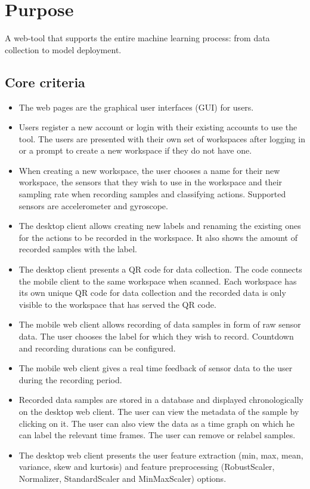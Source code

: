 \section{Purpose}
A web-tool that supports the entire machine learning process: from data collection to model deployment.

\subsection{Core criteria}
\begin{itemize}
    \item The web pages are the graphical user interfaces (GUI) for users.
    \item Users register a new account or login with their existing accounts to use the tool. The users are presented with their own set of workspaces after logging in or a prompt to create a new workspace if they do not have one.
    \item When creating a new workspace, the user chooses a name for their new workspace, the sensors that they wish to use in the workspace and their sampling rate when recording samples and classifying actions. Supported sensors are accelerometer and gyroscope.
    \item The desktop client allows creating new labels and renaming the existing ones for the actions to be recorded in the workspace. It also shows the amount of recorded samples with the label. 
    \item The desktop client presents a QR code for data collection. The code connects the mobile client to the same \gls{workspace} when scanned. Each workspace has its own unique QR code for data collection and the recorded data is only visible to the workspace that has served the QR code.
    \item The mobile web client allows recording of data samples in form of raw sensor data. The user chooses the label for which they wish to record. Countdown and recording durations can be configured.
    \item The mobile web client gives a real time feedback of sensor data to the user during the recording period.
    \item Recorded data samples are stored in a database and displayed chronologically on the desktop web client. The user can view the metadata of the sample by clicking on it. The user can also view the data as a time graph on which he can label the relevant time frames. The user can remove or relabel samples.
    \item The desktop web client presents the user feature extraction (min, max, mean, variance, skew and kurtosis) and feature preprocessing (RobustScaler, Normalizer, StandardScaler and MinMaxScaler) options.

\end{itemize}
